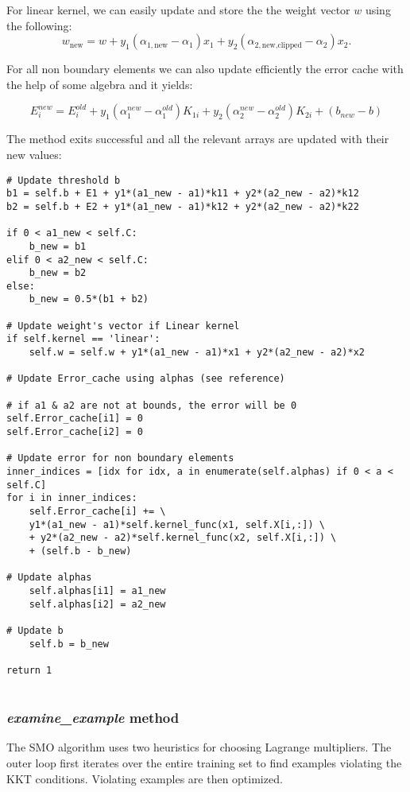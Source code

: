\documentclass[10pt,a4paper]{article}
\begin{document}
For linear kernel, we can easily update and store the the weight vector \( w \) using the following:
\[
w_{\text{new}} = w + y_1 (\alpha_{1,\text{new}} - \alpha_1) x_1 + y_2 (\alpha_{2,\text{new,clipped}} - \alpha_2) x_2.
\]

For all non boundary elements we can also update efficiently the error cache with the help of some algebra and it yields:

\[
E^{new}_i = E^{old}_i + y_1 (\alpha^{new}_1 -
\alpha^{old}_1) K_{1i} + y_2 (\alpha^{new}_2 - \alpha^{old}_2) K_{2i} +
(b_{new} - b)\]

The method exits successful and all the relevant arrays are updated with their new values:

\begin{lstlisting}
# Update threshold b
b1 = self.b + E1 + y1*(a1_new - a1)*k11 + y2*(a2_new - a2)*k12
b2 = self.b + E2 + y1*(a1_new - a1)*k12 + y2*(a2_new - a2)*k22
	
if 0 < a1_new < self.C:
	b_new = b1
elif 0 < a2_new < self.C:
	b_new = b2
else:
	b_new = 0.5*(b1 + b2)
	
# Update weight's vector if Linear kernel
if self.kernel == 'linear':
	self.w = self.w + y1*(a1_new - a1)*x1 + y2*(a2_new - a2)*x2
	
# Update Error_cache using alphas (see reference)
	
# if a1 & a2 are not at bounds, the error will be 0
self.Error_cache[i1] = 0
self.Error_cache[i2] = 0
	
# Update error for non boundary elements
inner_indices = [idx for idx, a in enumerate(self.alphas) if 0 < a < self.C]
for i in inner_indices:
	self.Error_cache[i] += \
	y1*(a1_new - a1)*self.kernel_func(x1, self.X[i,:]) \
	+ y2*(a2_new - a2)*self.kernel_func(x2, self.X[i,:]) \
	+ (self.b - b_new)
	
# Update alphas
	self.alphas[i1] = a1_new
	self.alphas[i2] = a2_new
	
# Update b
	self.b = b_new
	
return 1
	
\end{lstlisting}

\subsubsection{\textit{examine\_example} method}

The SMO algorithm uses two heuristics for choosing Lagrange multipliers. The outer loop first iterates over the entire training set to find examples violating the KKT conditions. Violating examples are then optimized. 
\end{document}
